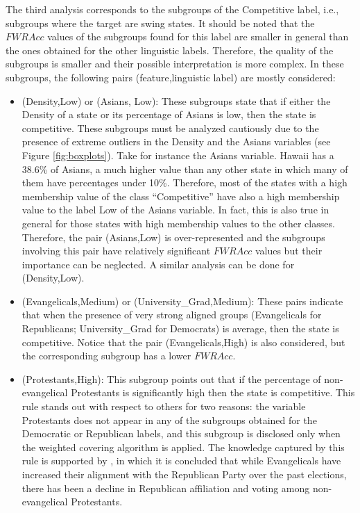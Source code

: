 The third analysis corresponds to the subgroups of the Competitive label, i.e., subgroups where the target are swing states. It should be noted that the $FWRAcc$ values of the subgroups found for this label are smaller in general than the ones obtained for the other linguistic labels. Therefore, the quality of the subgroups is smaller and their possible interpretation is more complex. In these subgroups, the following pairs (feature,linguistic label) are mostly considered:
\begin{itemize}
	\item (Density,Low) or (Asians, Low): These subgroups state that if either the Density of a state or its percentage of Asians is low, then the state is competitive. These subgroups must be analyzed cautiously due to the presence of extreme outliers in the Density and the Asians variables (see Figure \ref{fig:boxplots}). Take for instance the Asians variable. Hawaii has a 38.6\% of Asians, a much higher value than any other state in which many of them have percentages under 10\%. Therefore, most of the states with a high membership value of the class ``Competitive'' have also a high membership value to the label Low of the Asians variable. In fact, this is also true in general for those states with high membership values to the other classes. Therefore, the pair (Asians,Low) is over-represented and the subgroups involving this pair have relatively significant $FWRAcc$ values but their importance can be neglected. A similar analysis can be done for (Density,Low).  
	\item (Evangelicals,Medium) or (University\_Grad,Medium): These pairs indicate that when the presence of very strong aligned groups (Evangelicals for Republicans; University\_Grad for Democrats) is average, then the state is competitive. Notice that the pair (Evangelicals,High) is also considered, but the corresponding subgroup has a lower $FWRAcc$.
	\item (Protestants,High): This subgroup points out that if the percentage of non-evangelical Protestants is significantly high then the state is competitive. This rule stands out with respect to others for two reasons: the variable Protestants does not appear in any of the subgroups obtained for the Democratic or Republican labels, and this subgroup is disclosed only when the weighted covering algorithm is applied. The knowledge captured by this rule is supported by \cite{Schwadel2017}, in which it is concluded that while Evangelicals have increased their alignment with the Republican Party over the past elections, there has been a decline in Republican affiliation and voting among non-evangelical Protestants.
\end{itemize}

